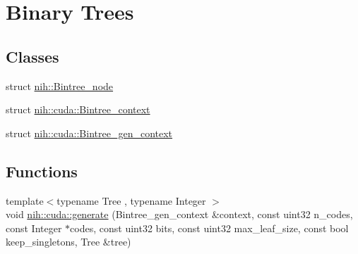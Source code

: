 \hypertarget{group__bintree}{
\section{\-Binary \-Trees}
\label{group__bintree}
}
\subsection*{\-Classes}
\begin{DoxyCompactItemize}
\item 
struct \hyperlink{structnih_1_1_bintree__node}{nih\-::\-Bintree\-\_\-node}
\item 
struct \hyperlink{structnih_1_1cuda_1_1_bintree__context}{nih\-::cuda\-::\-Bintree\-\_\-context}
\item 
struct \hyperlink{structnih_1_1cuda_1_1_bintree__gen__context}{nih\-::cuda\-::\-Bintree\-\_\-gen\-\_\-context}
\end{DoxyCompactItemize}
\subsection*{\-Functions}
\begin{DoxyCompactItemize}
\item 
{\footnotesize template$<$typename Tree , typename Integer $>$ }\\void \hyperlink{group__bintree_gad76a50ae08ab4d525f748a7cbcc0fb6e}{nih\-::cuda\-::generate} (\-Bintree\-\_\-gen\-\_\-context \&context, const uint32 n\-\_\-codes, const \-Integer $\ast$codes, const uint32 bits, const uint32 max\-\_\-leaf\-\_\-size, const bool keep\-\_\-singletons, \-Tree \&tree)
\end{DoxyCompactItemize}


